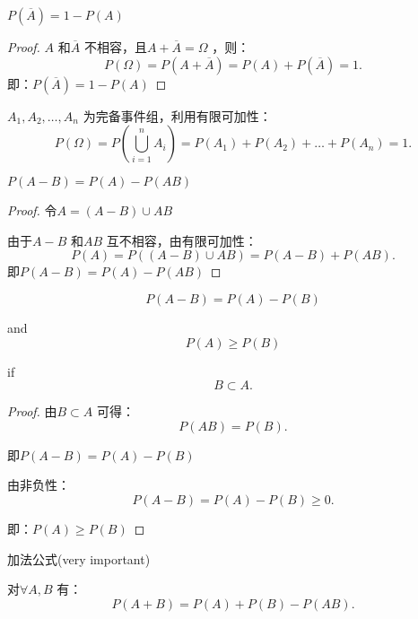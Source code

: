 \begin{rrule}
    $P\left( \overline{A} \right) =1-P\left( A \right) $
\end{rrule}
\begin{proof}
    $A$ 和$\overline{A}$ 不相容，且$A+\overline{A}=\Omega$ ，则：
    \[
        P\left( \Omega \right) =P\left( A+\overline{A} \right) =P\left( A \right) +P\left( \overline{A} \right) =1
    .\] 
    即：$P\left( \overline{A} \right) =1-P\left( A \right) $ 
\end{proof}
\begin{cor}
    $A_1,A_2,\ldots,A_n$ 为完备事件组，利用有限可加性：
    \[
        P\left( \Omega \right) =P\left( \bigcup_{i=1}^{n}A_i \right) =P\left( A_1 \right) +P\left( A_2 \right) +\ldots+P\left( A_n \right) =1
    .\] 
\end{cor}
\begin{rrule}
    $P\left( A-B \right) =P\left( A \right) -P\left( AB \right) $
\end{rrule}
\begin{proof}
    令$A =\left( A-B \right) \cup AB$

    由于$A-B$ 和$AB$ 互不相容，由有限可加性：
     \[
        P\left( A \right) =P\left( \left( A-B \right) \cup AB \right) =P\left( A-B \right) +P\left( AB \right) 
    .\] 
    即$P\left( A-B \right) =P\left( A \right) -P\left( AB \right) $
\end{proof}
\begin{rrule}
    \[
        P\left( A-B \right) =P\left( A \right) -P\left( B \right)
    \]

    and
    \[
        P\left( A \right) \ge P\left( B \right) 
    \] 
    
    if
    \[
        B\subset A
    .\] 

\end{rrule}
\begin{proof}
   由$B\subset A$ 可得：\[
       P\left( AB \right) =P\left( B \right) 
   .\] 

   即$P\left( A-B \right) =P\left( A \right) -P\left( B \right) $ 

   由非负性：\[
       P\left( A-B \right) =P\left( A \right) -P\left( B \right) \ge 0
   .\] 
   
   即：$P\left( A \right) \ge P\left( B \right) $
\end{proof}
\begin{rrule}
    加法公式(very important)

    对$\forall A,B$ 有：\[
        P\left( A+B \right) =P\left( A \right) +P\left( B \right) -P\left( AB \right) 
    .\] 
\end{rrule}

